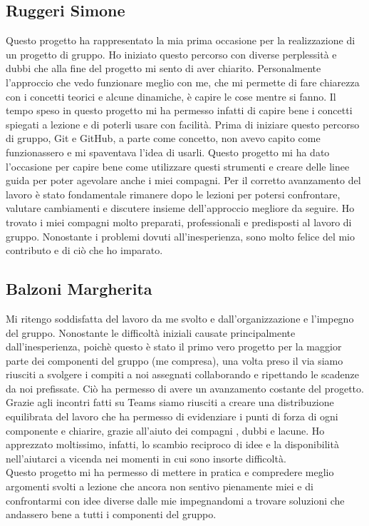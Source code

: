 \documentclass[a4paper,12pt]{report}
\begin{document}
\subsection{Ruggeri Simone}
Questo progetto ha rappresentato la mia prima occasione per la realizzazione di un progetto di gruppo. Ho iniziato questo percorso con diverse perplessità e dubbi
che alla fine del progetto mi sento di aver chiarito. Personalmente l'approccio che vedo funzionare meglio con me, che mi permette di fare chiarezza con i concetti
teorici e alcune dinamiche, è capire le cose mentre si fanno. Il tempo speso in questo progetto mi ha permesso infatti di capire bene i concetti spiegati a lezione e
di poterli usare con facilità. Prima di iniziare questo percorso di gruppo, Git e GitHub, a parte come concetto, non avevo capito come funzionassero e mi spaventava
l'idea di usarli. Questo progetto mi ha dato l'occasione per capire bene come utilizzare questi strumenti e creare delle linee guida per poter agevolare anche i miei
compagni. Per il corretto avanzamento del lavoro è stato fondamentale rimanere dopo le lezioni per potersi confrontare, valutare cambiamenti e discutere insieme
dell'approccio megliore da seguire. Ho trovato i miei compagni molto preparati, professionali e predisposti al lavoro di gruppo. Nonostante i problemi dovuti
all'inesperienza, sono molto felice del mio contributo e di ciò che ho imparato.
\subsection{Balzoni Margherita}
Mi ritengo soddisfatta del lavoro da me svolto e dall'organizzazione e l'impegno del gruppo. Nonostante le difficoltà iniziali causate principalmente dall'inesperienza,
poichè questo è stato il primo vero progetto per la maggior parte dei componenti del gruppo (me compresa), una volta preso il via siamo riusciti a svolgere i compiti a
noi assegnati collaborando e ripettando le scadenze da noi prefissate. Ciò ha permesso di avere un avanzamento costante del progetto.
\\Grazie agli incontri fatti su Teams siamo riusciti a creare una distribuzione equilibrata del lavoro che ha permesso di evidenziare i punti di forza di ogni componente e chiarire, grazie all'aiuto dei compagni , dubbi e lacune.
Ho apprezzato moltissimo, infatti,  lo scambio reciproco di idee e la disponibilità nell'aiutarci a vicenda nei momenti in cui sono insorte difficoltà.
\\Questo progetto mi ha permesso di mettere in pratica e compredere  meglio argomenti svolti a lezione che ancora non sentivo pienamente miei e di confrontarmi con idee diverse dalle mie impegnandomi a trovare soluzioni che andassero bene a tutti i componenti del gruppo.
\end{document}
